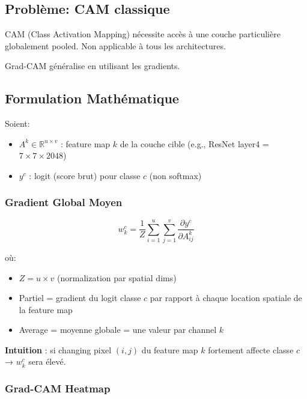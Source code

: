 \documentclass[12pt,a4paper,oneside]{report}
\begin{document}
\subsection{Problème: CAM classique}

CAM (Class Activation Mapping) nécessite accès à une couche 
particulière globalement pooled. Non applicable à tous les architectures.

Grad-CAM généralise en utilisant les gradients.

\subsection{Formulation Mathématique}

Soient:
\begin{itemize}
    \item $A^k \in \mathbb{R}^{u \times v}$ : feature map $k$ de la 
          couche cible (e.g., ResNet layer4 = $ 7 \times 7 \times 2048$)
    \item $y^c$ : logit (score brut) pour classe $c$ (non softmax)
\end{itemize}

\subsubsection{Gradient Global Moyen }

\begin{equation}
w_k^c = \frac{1}{Z} \sum_{i=1}^{u} \sum_{j=1}^{v} 
\frac{\partial y^c}{\partial A_{ij}^k}
\label{eq:gradcam_weights_detailed}
\end{equation}

où:
\begin{itemize}
    \item $Z = u \times v$ (normalization par spatial dims)
    \item Partiel = gradient du logit classe $c$ par rapport 
          à chaque location spatiale de la feature map
    \item Average = moyenne globale = une valeur par channel $k$
\end{itemize}

\textbf{Intuition} : si changing pixel $(i,j)$ du feature map $k$ 
fortement affecte classe $c$ → $w_k^c$ sera élevé.

\subsubsection{Grad-CAM Heatmap}
\end{document}
